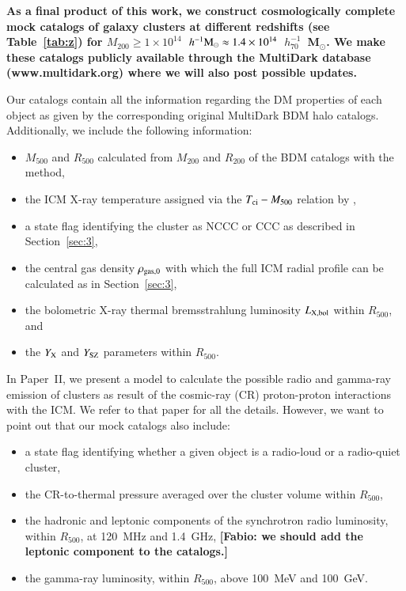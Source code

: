 \documentclass[useAMS,usenatbib]{mn2e}
\newcommand\qc[1]{{\color{red} \bf #1}}
\begin{document}
{\bf As a final product of this work, we construct cosmologically complete mock
  catalogs of galaxy clusters at different redshifts (see Table~\ref{tab:z}) for
  $M_{200}\geq1\times10^{14}$~$h^{-1}{\mathrm{M}}_{\odot}
  \approx1.4\times10^{14}$~$h_{70}^{-1}$~M$_{\odot}$.  We make these catalogs
  publicly available through the MultiDark database (www.multidark.org) where we
  will also post possible updates.

  Our catalogs contain all the information regarding the DM properties of each
  object as given by the corresponding original MultiDark BDM halo
  catalogs. Additionally, we include the following information:

\begin{itemize}
\item $M_{500}$ and $R_{500}$ calculated from $M_{200}$ and $R_{200}$ of the BDM catalogs with the \cite{2003ApJ...584..702H} method,
\item the ICM X-ray temperature assigned via the $T_{{\mathrm{ci}}}-M_{500}$ relation by \cite{2010MNRAS.406.1773M},
\item a state flag identifying the cluster as NCCC or CCC as described in Section~\ref{sec:3},
\item the central gas density $\rho_{{\mathrm{gas}},0}$ with which the full ICM radial profile can be calculated as in Section~\ref{sec:3},
\item the bolometric X-ray thermal bremsstrahlung luminosity $L_{{\mathrm{X, bol}}}$
  within $R_{500}$, and
\item the $Y_{{\mathrm{X}}}$ and $Y_{{\mathrm{SZ}}}$ parameters within $R_{500}$.
\end{itemize}

In Paper~II, we present a model to calculate the possible radio and gamma-ray
emission of clusters as result of the cosmic-ray (CR) proton-proton interactions
with the ICM. We refer to that paper for all the details. However, we want to
point out that our mock catalogs also include:

\begin{itemize}
\item a state flag identifying whether a given object is a radio-loud or a radio-quiet cluster, 
\item the CR-to-thermal pressure averaged over the cluster volume within $R_{500}$,
\item the hadronic and leptonic components of the synchrotron radio luminosity,
  within $R_{500}$, at 120~MHz and 1.4~GHz, \qc{[Fabio: we should add the
    leptonic component to the catalogs.]}
\item the gamma-ray luminosity, within $R_{500}$, above 100~MeV and 100~GeV.
\end{itemize}

}
\end{document}
